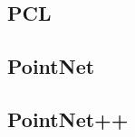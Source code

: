 \documentclass[../report.tex]{subfiles}
\begin{document}
\subsection{PCL}
\subsection{PointNet}
\subsection{PointNet++}


\end{document}
